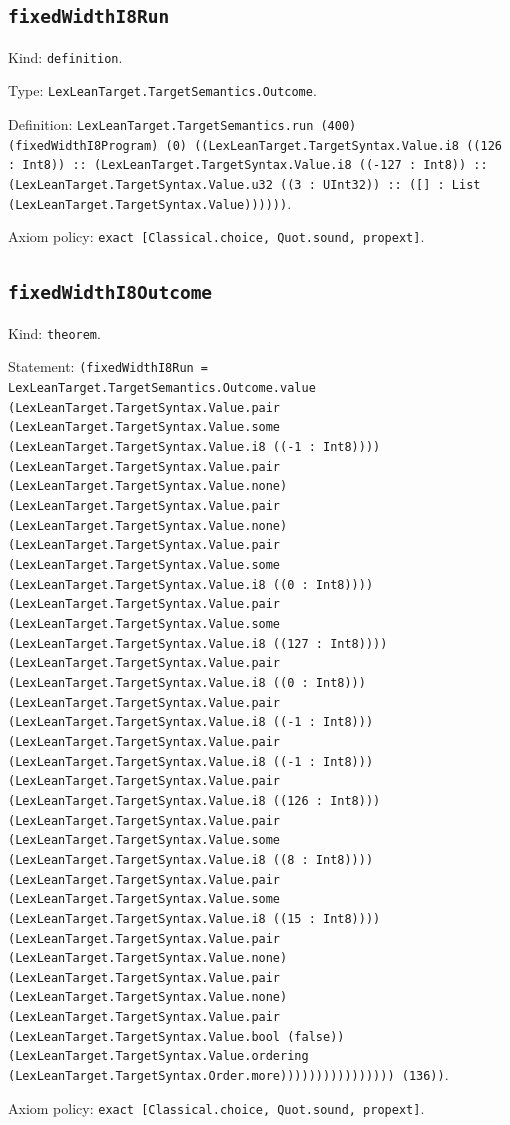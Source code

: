 \documentclass[11pt]{article}
\begin{document}
\subsection*{\texttt{fixedWidthI8Run}}
\noindent Kind: \texttt{definition}.\par
\noindent Type: \texttt{LexLeanTarget.TargetSemantics.Outcome}.\par
\noindent Definition: \texttt{LexLeanTarget.TargetSemantics.run (400) (fixedWidthI8Program) (0) ((LexLeanTarget.TargetSyntax.Value.i8 ((126 : Int8)) :: (LexLeanTarget.TargetSyntax.Value.i8 ((-127 : Int8)) :: (LexLeanTarget.TargetSyntax.Value.u32 ((3 : UInt32)) :: ([] : List (LexLeanTarget.TargetSyntax.Value))))))}.\par
\noindent Axiom policy: \texttt{exact [Classical.choice, Quot.sound, propext]}.\par
\subsection*{\texttt{fixedWidthI8Outcome}}
\noindent Kind: \texttt{theorem}.\par
\noindent Statement: \texttt{(fixedWidthI8Run = LexLeanTarget.TargetSemantics.Outcome.value (LexLeanTarget.TargetSyntax.Value.pair (LexLeanTarget.TargetSyntax.Value.some (LexLeanTarget.TargetSyntax.Value.i8 ((-1 : Int8)))) (LexLeanTarget.TargetSyntax.Value.pair (LexLeanTarget.TargetSyntax.Value.none) (LexLeanTarget.TargetSyntax.Value.pair (LexLeanTarget.TargetSyntax.Value.none) (LexLeanTarget.TargetSyntax.Value.pair (LexLeanTarget.TargetSyntax.Value.some (LexLeanTarget.TargetSyntax.Value.i8 ((0 : Int8)))) (LexLeanTarget.TargetSyntax.Value.pair (LexLeanTarget.TargetSyntax.Value.some (LexLeanTarget.TargetSyntax.Value.i8 ((127 : Int8)))) (LexLeanTarget.TargetSyntax.Value.pair (LexLeanTarget.TargetSyntax.Value.i8 ((0 : Int8))) (LexLeanTarget.TargetSyntax.Value.pair (LexLeanTarget.TargetSyntax.Value.i8 ((-1 : Int8))) (LexLeanTarget.TargetSyntax.Value.pair (LexLeanTarget.TargetSyntax.Value.i8 ((-1 : Int8))) (LexLeanTarget.TargetSyntax.Value.pair (LexLeanTarget.TargetSyntax.Value.i8 ((126 : Int8))) (LexLeanTarget.TargetSyntax.Value.pair (LexLeanTarget.TargetSyntax.Value.some (LexLeanTarget.TargetSyntax.Value.i8 ((8 : Int8)))) (LexLeanTarget.TargetSyntax.Value.pair (LexLeanTarget.TargetSyntax.Value.some (LexLeanTarget.TargetSyntax.Value.i8 ((15 : Int8)))) (LexLeanTarget.TargetSyntax.Value.pair (LexLeanTarget.TargetSyntax.Value.none) (LexLeanTarget.TargetSyntax.Value.pair (LexLeanTarget.TargetSyntax.Value.none) (LexLeanTarget.TargetSyntax.Value.pair (LexLeanTarget.TargetSyntax.Value.bool (false)) (LexLeanTarget.TargetSyntax.Value.ordering (LexLeanTarget.TargetSyntax.Order.more)))))))))))))))) (136))}.\par
\noindent Axiom policy: \texttt{exact [Classical.choice, Quot.sound, propext]}.\par
\end{document}
